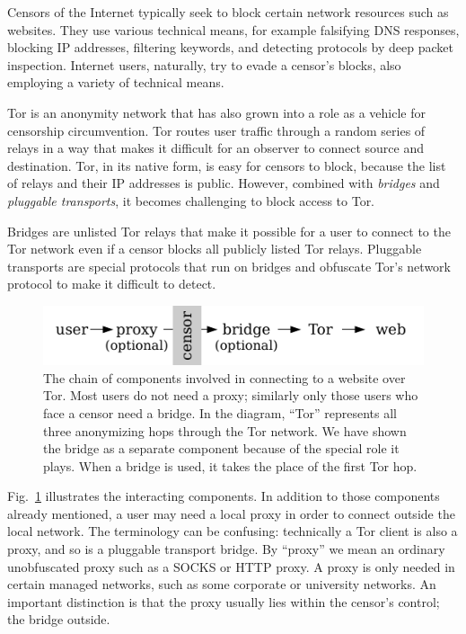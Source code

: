 \documentclass[USenglish,oneside,twocolumn]{article}
\begin{document}
Censors of the Internet typically seek to block certain network resources such as websites.
They use various technical means, for example falsifying DNS responses,
blocking IP addresses, filtering keywords, and detecting protocols by deep packet inspection.
Internet users, naturally, try to evade a censor's blocks,
also employing a variety of technical means.

Tor is an anonymity network that has also grown into
a role as a vehicle for censorship circumvention.
Tor routes user traffic through a random series of relays
in a way that makes it difficult for an observer to connect source and destination.
Tor, in its native form, is easy for censors to block,
because the list of relays and their IP addresses is public.
However, combined with \emph{bridges} and
\emph{pluggable transports}, it becomes challenging to block access to Tor.

Bridges are unlisted Tor relays that make it possible for a user to connect
to the Tor network even if a censor blocks all publicly listed Tor relays.
Pluggable transports are special protocols that run on bridges and obfuscate
Tor's network protocol to make it difficult to detect.

\begin{figure}
\centering
\includegraphics{topology.pdf}
\caption{
The chain of components involved in connecting to a website over Tor.
Most users do not need a proxy;
similarly only those users who face a censor need a bridge.
In the diagram, ``Tor'' represents all three anonymizing hops through the Tor network.
We have shown the bridge as a separate component
because of the special role it plays.
When a bridge is used, it takes the place of the first Tor hop.
}
\label{fig:topology}
\end{figure}

Fig.~\ref{fig:topology} illustrates the interacting components.
In addition to those components already mentioned,
a user may need a local proxy in order to connect outside the local network.
The terminology can be confusing:
technically a Tor client is also a proxy,
and so is a pluggable transport bridge.
By ``proxy'' we mean an ordinary unobfuscated proxy such
as a SOCKS or HTTP proxy.
A proxy is only needed in certain managed networks,
such as some corporate or university networks.
An important distinction is that the proxy usually lies within the censor's control;
the bridge outside.
\end{document}
